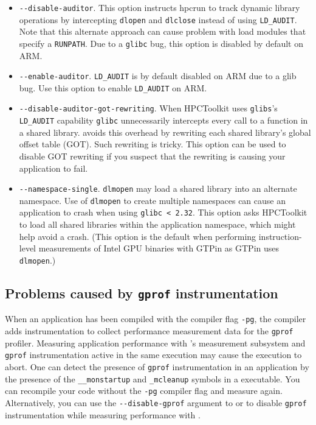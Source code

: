 \documentclass[11pt,twoside,letterpaper]{report}
\begin{document}
\begin{itemize}
\item\verb|--disable-auditor|. This option instructs hpcrun to track dynamic library operations by intercepting {\tt dlopen} and {\tt dlclose} instead of using {\tt LD\_AUDIT}. 
 Note that this alternate approach can cause problem with load modules that specify a {\tt RUNPATH}. 
 Due to a {\tt glibc} bug, this option is disabled by default on ARM.

\item\verb|--enable-auditor|. {\tt LD\_AUDIT} is by default disabled on ARM due to a glib bug. Use this option to enable {\tt LD\_AUDIT} on ARM.

\item\verb|--disable-auditor-got-rewriting|. When HPCToolkit uses  {\tt glibs}'s {\tt LD\_AUDIT}  capability {\tt glibc} unnecessarily intercepts every call to a function in a shared library. 
\hpcrun{} avoids this overhead by rewriting each shared library's global offset table (GOT). Such rewriting is tricky. This option can be used to disable GOT rewriting if you suspect that the rewriting is causing your application to fail.

\item\verb|--namespace-single|.   {\tt dlmopen} may load a shared library into an alternate namespace.  Use of {\tt dlmopen} to create multiple namespaces can cause an application to crash when using \verb|glibc < 2.32|. This option asks HPCToolkit to load all  shared libraries within the application namespace, which might help avoid a crash.  (This option is the default when performing instruction-level measurements of Intel GPU binaries with GTPin as GTPin uses  {\tt dlmopen}.)
\end{itemize}


\subsection{Problems caused by {\tt gprof} instrumentation}

When an application has been compiled with the compiler flag \verb|-pg|,
the compiler adds instrumentation to collect performance measurement data for
the \verb|gprof| profiler. Measuring application performance with
\HPCToolkit{}'s measurement subsystem and \verb|gprof| instrumentation
active in the same execution may cause the execution
to abort. One can detect the presence of \verb|gprof| instrumentation in an
application by the presence of the \verb|__monstartup| and \verb|_mcleanup| symbols
in a executable.  You can recompile your code without the
\verb|-pg| compiler flag and measure again. Alternatively, you can use the \verb|--disable-gprof|
argument to \hpcrun{} or \hpclink{} to disable \verb|gprof| instrumentation while 
measuring performance with \HPCToolkit{}.
\end{document}
